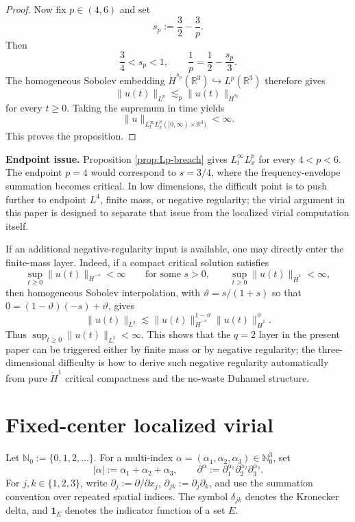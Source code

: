 \documentclass[smallextended,envcountsect,nospthms]{svjour3}
\numberwithin{equation}{section}
\theoremstyle{spbreak}
\theoremstyle{spdefbreak}
\theoremstyle{spdefbreak}
\newcommand{\R}{\mathbb R}
\begin{document}
\begin{proof}
Now fix $p\in(4,6)$ and set
\begin{equation*}
  s_p:=\frac32-\frac3p.
\end{equation*}
Then
\begin{equation*}
  \frac34<s_p<1,
  \qquad
  \frac1p=\frac12-\frac{s_p}{3}.
\end{equation*}
The homogeneous Sobolev embedding $\dot H^{s_p}(\R^3)\hookrightarrow L^p(\R^3)$ therefore gives
\begin{equation*}
  \|u(t)\|_{L^p}
  \lesssim_p \|u(t)\|_{\dot H^{s_p}}
\end{equation*}
for every $t\ge0$. Taking the supremum in time yields
\begin{equation*}
  \|u\|_{L_t^\infty L_x^p([0,\infty)\times\R^3)}<\infty.
\end{equation*}
This proves the proposition.
\end{proof}

\medskip
\noindent\textbf{Endpoint issue.} Proposition \ref{prop:Lp-breach} gives $L_t^\infty L_x^p$ for every $4<p<6$. The endpoint $p=4$ would correspond to $s=3/4$, where the frequency-envelope summation becomes critical. In low dimensions, the difficult point is to push further to endpoint $L^4$, finite mass, or negative regularity; the virial argument in this paper is designed to separate that issue from the localized virial computation itself.

\medskip
If an additional negative-regularity input is available, one may directly enter the finite-mass layer. Indeed, if a compact critical solution satisfies
\[
  \sup_{t\ge0}\|u(t)\|_{\dot H^{-s}}<\infty
  \qquad\text{for some }s>0,
  \qquad
  \sup_{t\ge0}\|u(t)\|_{\dot H^1}<\infty,
\]
then homogeneous Sobolev interpolation, with $\vartheta=s/(1+s)$ so that $0=(1-\vartheta)(-s)+\vartheta$, gives
\[
  \|u(t)\|_{L^2}
  \lesssim \|u(t)\|_{\dot H^{-s}}^{1-\vartheta}
           \|u(t)\|_{\dot H^1}^{\vartheta}.
\]
Thus $\sup_{t\ge0}\|u(t)\|_{L^2}<\infty$. This shows that the $q=2$ layer in the present paper can be triggered either by finite mass or by negative regularity; the three-dimensional difficulty is how to derive such negative regularity automatically from pure $\dot H^1$ critical compactness and the no-waste Duhamel structure.

\section{Fixed-center localized virial}\label{sec:virial}

Let $\mathbb N_0:=\{0,1,2,\ldots\}$. For a multi-index $\alpha=(\alpha_1,\alpha_2,\alpha_3)\in\mathbb N_0^3$, set
\begin{equation*}
  |\alpha|:=\alpha_1+\alpha_2+\alpha_3,
  \qquad
  \partial^\alpha:=\partial_1^{\alpha_1}\partial_2^{\alpha_2}\partial_3^{\alpha_3}.
\end{equation*}
For $j,k\in\{1,2,3\}$, write $\partial_j:=\partial/\partial x_j$, $\partial_{jk}:=\partial_j\partial_k$, and use the summation convention over repeated spatial indices. The symbol $\delta_{jk}$ denotes the Kronecker delta, and $\mathbf 1_E$ denotes the indicator function of a set $E$.
\end{document}
